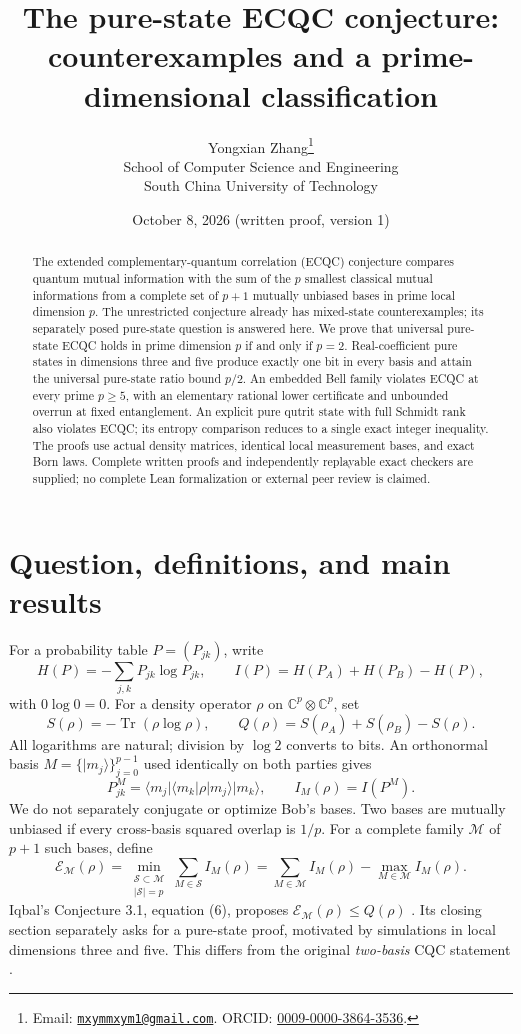 \documentclass[11pt]{article}
\title{The pure-state ECQC conjecture:\protect\\ counterexamples and a prime-dimensional classification}
\author{Yongxian Zhang\thanks{Email: \href{mailto:mxymmxym1@gmail.com}{\texttt{mxymmxym1@gmail.com}}. ORCID: \href{https://orcid.org/0009-0000-3864-3536}{0009-0000-3864-3536}.}\\[3pt]
\small School of Computer Science and Engineering\\
\small South China University of Technology}
\date{October 8, 2026 \quad (written proof, version 1)}
\theoremstyle{remark}
\newcommand{\C}{\mathbb C}
\newcommand{\E}{\mathcal E}
\newcommand{\M}{\mathcal M}
\newcommand{\ket}[1]{\lvert #1\rangle}
\newcommand{\bra}[1]{\langle #1\rvert}
\DeclareMathOperator{\Tr}{Tr}
\begin{document}
\maketitle
\begin{abstract}
The extended complementary-quantum correlation (ECQC) conjecture compares quantum mutual information with the sum of the $p$ smallest classical mutual informations from a complete set of $p+1$ mutually unbiased bases in prime local dimension $p$. The unrestricted conjecture already has mixed-state counterexamples; its separately posed pure-state question is answered here. We prove that universal pure-state ECQC holds in prime dimension $p$ if and only if $p=2$. Real-coefficient pure states in dimensions three and five produce exactly one bit in every basis and attain the universal pure-state ratio bound $p/2$. An embedded Bell family violates ECQC at every prime $p\geq5$, with an elementary rational lower certificate and unbounded overrun at fixed entanglement. An explicit pure qutrit state with full Schmidt rank also violates ECQC; its entropy comparison reduces to a single exact integer inequality. The proofs use actual density matrices, identical local measurement bases, and exact Born laws. Complete written proofs and independently replayable exact checkers are supplied; no complete Lean formalization or external peer review is claimed.
\end{abstract}

\section{Question, definitions, and main results}
For a probability table $P=(P_{jk})$, write
\[
 H(P)=-\sum_{j,k}P_{jk}\log P_{jk},\qquad
 I(P)=H(P_A)+H(P_B)-H(P),
\]
with $0\log0=0$. For a density operator $\rho$ on $\C^p\otimes\C^p$, set
\[
 S(\rho)=-\Tr(\rho\log\rho),\qquad
 Q(\rho)=S(\rho_A)+S(\rho_B)-S(\rho).
\]
All logarithms are natural; division by $\log2$ converts to bits.
An orthonormal basis $M=\{\ket{m_j}\}_{j=0}^{p-1}$ used identically on both parties gives
\begin{equation}\label{eq:born}
 P^M_{jk}=\bra{m_j}\bra{m_k}\rho\ket{m_j}\ket{m_k},
 \qquad I_M(\rho)=I(P^M).
\end{equation}
We do not separately conjugate or optimize Bob's bases. Two bases are mutually unbiased if every cross-basis squared overlap is $1/p$.
For a complete family $\M$ of $p+1$ such bases, define
\begin{equation}\label{eq:score}
 \E_\M(\rho)=\min_{\substack{\mathcal S\subset\M\\|\mathcal S|=p}}
 \sum_{M\in\mathcal S}I_M(\rho)
 =\sum_{M\in\M}I_M(\rho)-\max_{M\in\M}I_M(\rho).
\end{equation}
Iqbal's Conjecture 3.1, equation (6), proposes $\E_\M(\rho)\leq Q(\rho)$ \cite{iqbal}. Its closing section separately asks for a pure-state proof, motivated by simulations in local dimensions three and five. This differs from the original \emph{two-basis} CQC statement \cite{schneeloch}.
\end{document}
